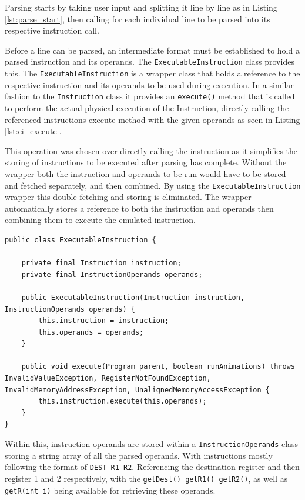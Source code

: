 Parsing starts by taking user input and splitting it line by line as in Listing \ref{lst:parse_start}, then calling for each individual line to be parsed into its respective instruction call.

Before a line can be parsed, an intermediate format must be established to hold a parsed instruction and its operands. The \texttt{ExecutableInstruction} class provides this. The \texttt{ExecutableInstruction} is a wrapper class that holds a reference to the respective instruction and its operands to be used during execution. In a similar fashion to the \texttt{Instruction} class it provides an \verb|execute()| method that is called to perform the actual physical execution of the Instruction, directly calling the referenced instructions execute method with the given operands as seen in Listing \ref{lst:ei_execute}. 

This operation was chosen over directly calling the instruction as it simplifies the storing of instructions to be executed after parsing has complete. Without the wrapper both the instruction and operands to be run would have to be stored and fetched separately, and then combined. By using the \newline\texttt{ExecutableInstruction} wrapper this double fetching and storing is eliminated. The wrapper automatically stores a reference to both the instruction and operands then combining them to execute the emulated instruction.

\begin{lstlisting}[caption=ExecutableInstruction class, label=lst:ei_execute]
public class ExecutableInstruction {

    private final Instruction instruction;
    private final InstructionOperands operands;

    public ExecutableInstruction(Instruction instruction, InstructionOperands operands) {
        this.instruction = instruction;
        this.operands = operands;
    }

    public void execute(Program parent, boolean runAnimations) throws InvalidValueException, RegisterNotFoundException, InvalidMemoryAddressException, UnalignedMemoryAccessException {
        this.instruction.execute(this.operands);
    }
}
\end{lstlisting}

Within this, instruction operands are stored within a \texttt{InstructionOperands} class storing a string array of all the parsed operands. With instructions mostly following the format of \verb|DEST R1 R2|. Referencing the destination register and then register 1 and 2 respectively, with the \verb|getDest() getR1() getR2()|, as well as \verb|getR(int i)| being available for retrieving these operands.

